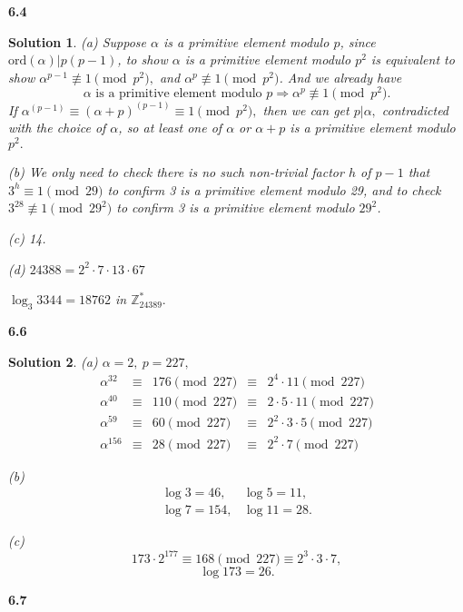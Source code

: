 \documentclass[12pt,a4paper]{article}
\newcommand{\lra}{\Longrightarrow}
\theoremstyle{solution}
\newtheorem*{sol}{Solution}
\begin{document}
\textbf{6.4}
\begin{sol}
{\em (a)} Suppose $\alpha$ is a primitive element modulo $p$, since $\mathrm{ord}(\alpha)|p(p-1)$, to show $\alpha$ is a primitive element modulo $p^2$ is equivalent to show $\alpha^{p-1} \nequiv 1 \pmod{p^2},$ and $\alpha^p \nequiv 1 \pmod{p^2}$. And we already have
$$
\alpha \text{ is a primitive element modulo } p \lra \alpha^p \nequiv 1 \pmod{p^2}.
$$
If $\alpha^{(p-1)}\equiv(\alpha+p)^{(p-1)}\equiv 1 \pmod{p^2},$ then we can get $p|\alpha,$ contradicted with the choice of $\alpha$, so at least one of $\alpha$ or $\alpha +p$ is a primitive element modulo $p^2.$

{\em(b)} We only need to check there is no such non-trivial factor $h$ of $p-1$ that $3^h\equiv 1 \pmod{29}$ to confirm 3 is a primitive element modulo 29, and to check $3^{28}\nequiv 1\pmod{29^2}$ to confirm 3 is a primitive element modulo $29^2$.

{\em(c)} 14.

{\em(d)} $24388=2^2\cdot7\cdot 13\cdot67$

$\log_3 3344 =18762 $ in $\mathbb{Z}_{24389}^*.$
\end{sol}

\textbf{6.6}

\begin{sol}
{\em (a)} $\alpha=2,~p=227,$
$$
\begin{array}{rcccl}
\alpha^{32}&\equiv&176 \pmod{227}&\equiv&2^4 \cdot11 \pmod{227}\\
\alpha^{40}&\equiv&110 \pmod{227}&\equiv&2\cdot5\cdot11 \pmod{227}\\
\alpha^{59}&\equiv&60 \pmod{227}&\equiv&2^2\cdot3\cdot5 \pmod{227}\\
\alpha^{156}&\equiv&28 \pmod{227}&\equiv&2^2\cdot7 \pmod{227}
\end{array}
$$

{\em (b)}
$$
\begin{array}{ll}
\log3=46,&\log5=11,\\
\log7=154,&\log11=28.
\end{array}
$$

{\em (c)}
$$173\cdot 2^{177}\equiv 168 \pmod{227}\equiv 2^3\cdot3\cdot7,$$
$$\log173=26.$$
\end{sol}

\textbf{6.7}
\end{document}
